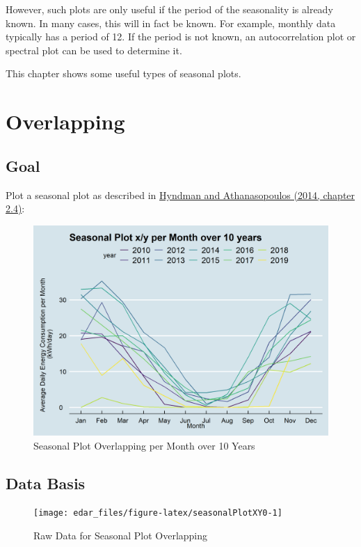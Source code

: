 \documentclass[
  a4paperpaper,
]{book}
\begin{document}
However, such plots are only useful if the period of the seasonality is already known. In many cases, this will in fact be known. For example, monthly data typically has a period of 12. If the period is not known, an autocorrelation plot or spectral plot can be used to determine it.

This chapter shows some useful types of seasonal plots.

\hypertarget{overlapping}{%
\section{Overlapping}\label{overlapping}}

\hypertarget{goal-6}{%
\subsection{Goal}\label{goal-6}}

Plot a seasonal plot as described in \href{https://otexts.com/fpp2/seasonal-plots.html}{Hyndman and Athanasopoulos (2014, chapter 2.4)}:

\begin{figure}
\includegraphics[width=0.7\linewidth]{images/plotSeasonalXY} \caption{Seasonal Plot Overlapping per Month over 10 Years}\label{fig:unnamed-chunk-15}
\end{figure}

\hypertarget{data-basis-6}{%
\subsection{Data Basis}\label{data-basis-6}}

\begin{figure}
\texttt{[image: edar\_files/figure-latex/seasonalPlotXY0-1]} \caption{Raw Data for Seasonal Plot Overlapping}\label{fig:seasonalPlotXY0}
\end{figure}
\end{document}
